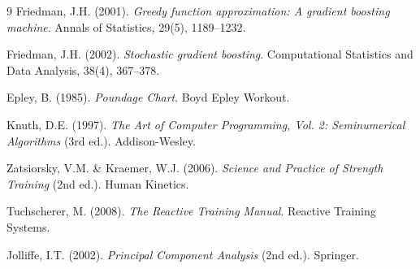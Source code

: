 \documentclass[12pt,a4paper]{report}
\theoremstyle{definition}
\begin{document}
\begin{thebibliography}{9}
  Friedman, J.H. (2001).
  \textit{Greedy function approximation: A gradient boosting machine}.
  Annals of Statistics, 29(5), 1189--1232.

  Friedman, J.H. (2002).
  \textit{Stochastic gradient boosting}.
  Computational Statistics and Data Analysis, 38(4), 367--378.

  Epley, B. (1985).
  \textit{Poundage Chart}. Boyd Epley Workout.

  Knuth, D.E. (1997).
  \textit{The Art of Computer Programming, Vol. 2: Seminumerical Algorithms} (3rd ed.).
  Addison-Wesley.

  Zatsiorsky, V.M. \& Kraemer, W.J. (2006).
  \textit{Science and Practice of Strength Training} (2nd ed.).
  Human Kinetics.

  Tuchscherer, M. (2008).
  \textit{The Reactive Training Manual}.
  Reactive Training Systems.

  Jolliffe, I.T. (2002).
  \textit{Principal Component Analysis} (2nd ed.).
  Springer.
\end{thebibliography}
\end{document}
